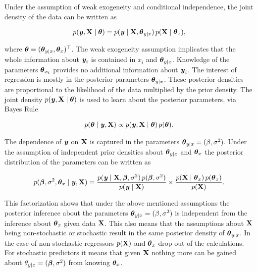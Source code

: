 \documentclass[11pt,a4paper,twoside]{book}
\begin{document}
Under the assumption of weak exogeneity and conditional independence, the joint density of the data can be written as

       \begin{align*} 
p({\textbf{\textit{y}}}, {\mathbf{X}} \mid {\boldsymbol{\theta}}{}) = p({\textbf{\textit{y}}} \mid {\mathbf{X}}, {\boldsymbol{\theta}}{}_{y \mid x}) \, p({\mathbf{X}} \mid {\boldsymbol{\theta}}{}_{x}),
   \end{align*}

where ${\boldsymbol{\theta}}{} = ({\boldsymbol{\theta}}{}_{y \mid x}, {\boldsymbol{\theta}}{}_{x})^\top$. The weak exogeneity assumption implicates that the whole information about ${\textbf{\textit{y}}}_{i}$ is contained in $x_{i}$ and ${\boldsymbol{\theta}}{}_{y \mid x}$. Knowledge of the parameters ${\boldsymbol{\theta}}{}_{x_{i}}$ provides no additional information about ${\textbf{\textit{y}}}_{i}$.
The interest of regression is mostly in the posterior parameters ${\boldsymbol{\theta}}{}_{y \mid x}$. These posterior densities are proportional to the likelihood of the data  multiplied by the prior density. The joint density $p({\textbf{\textit{y}}}, {\mathbf{X}} \mid  {\boldsymbol{\theta}}{})$ is used to learn about the posterior parameters, via Bayes Rule

       \begin{align*} 
p({\boldsymbol{\theta}}{} \mid {\textbf{\textit{y}}}, {\mathbf{X}}) \propto p({\textbf{\textit{y}}}, {\mathbf{X}} \mid  {\boldsymbol{\theta}}{}) \, p({\boldsymbol{\theta}}{}).
   \end{align*}
   
   The dependence of ${\textbf{\textit{y}}}$ on ${\mathbf{X}}$ is captured in the parameters ${\boldsymbol{\theta}}{}_{y \mid x} = (\beta, \sigma^2)$. Under the assumption of independent prior densities about ${\boldsymbol{\theta}}{}_{y \mid x}$ and ${\boldsymbol{\theta}}{}_{x}$ the posterior distribution of the parameters can be written as
   
          \begin{align} 
p({\boldsymbol{\beta}}, \sigma^2, {\boldsymbol{\theta}}{}_{x} \mid {\textbf{\textit{y}}}, {\mathbf{X}}) = \frac{p({\textbf{\textit{y}}} \mid {\mathbf{X}}, {\boldsymbol{\beta}}, \sigma^2) \, p({\boldsymbol{\beta}}, \sigma^2)}{p({\textbf{\textit{y}}} \mid {\mathbf{X}})} \times \frac{p({\mathbf{X}} \mid {\boldsymbol{\theta}}{}_{x}) \, p({\boldsymbol{\theta}}{}_{x})}{p({\mathbf{X}})}.  \label{eq:bayesf} 
   \end{align}
   
  This factorization shows that under the above mentioned assumptions the posterior inference about the parameters ${\boldsymbol{\theta}}{}_{y \mid x} = (\beta, \sigma^2)$ is independent from the inference about ${\boldsymbol{\theta}}{}_{x}$ given data ${\mathbf{X}}$. This also means that the assumptions about ${\mathbf{X}}$ being non-stochastic or stochastic result in the same posterior density of  ${\boldsymbol{\theta}}{}_{y \mid x}$. In the case of non-stochastic regressors $p({\mathbf{X}})$ and ${\boldsymbol{\theta}}{}_{x}$ drop out of the calculations. For stochastic predictors it means that given ${\mathbf{X}}$ nothing more can be gained about $\theta_{y \mid x} = ({\boldsymbol{\beta}}, \sigma^2)$ from knowing ${\boldsymbol{\theta}}{}_{x}$. 
  
\end{document}
